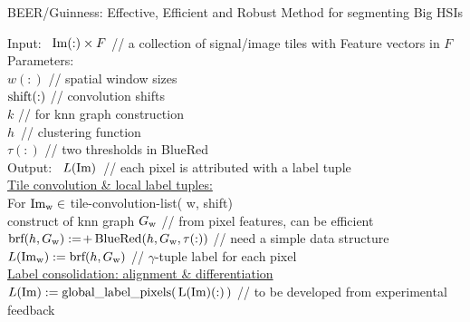 

\begin{algorithm}[H] 
  \caption{  \footnotesize
    BEER/Guinness: Effective, Efficient and Robust Method for
    segmenting Big HSIs
    \label{alg:ben-tile} }
  \SetAlgoLined
  {Input:\ } ${\rm Im}(:) \times F$ \phantom{space}
  // {\footnotesize a collection of signal/image tiles with Feature vectors in $F$}
  \\
  {\rm Parameters:\ }
  \\
  \phantom{Input:\ } $w(:)$ \phantom{make space}
  // {\footnotesize spatial window sizes}
  \\
  \phantom{Input:\ } $ {\rm shift}(:) $ \phantom{space xxx}
  // {\footnotesize convolution shifts}
  \\
  \phantom{Input:\ } $ k $ \phantom{make space xxx}
  // {\footnotesize for knn graph construction}
  \\
  \phantom{Input:\ } $h$\, \phantom{make space xx}
  // {\footnotesize clustering function}
  \\
  \phantom{Input:\ } $ \tau(:) $ \phantom{make space}
  // {\footnotesize two thresholds in BlueRed}
  \\
  {\rm Output:\ } $L(\rm Im)$\, \phantom{space}
  // {\footnotesize each pixel is attributed with a label tuple}
  \\
  \underline{Tile convolution \& local label tuples:}
  \\ 
  For $\mbox{\rm Im}_{\rm w}  \in$ {\rm tile-convolution-list}( w, shift)
  \\
  \phantom{xxx} construct of knn graph $G_{\rm w}$
  \phantom{make space }
  // {\footnotesize from pixel features, can be efficient}  
  \\
  \phantom{xxx}
  $\mbox{\rm brf}(h,G_{\rm w}) :=\!+\! {\  }
    \mbox{\rm BlueRed}( h,G_{\rm w}, \tau(:) )$
    \phantom{xxxx}
    // {\footnotesize need a simple data structure}  
  \\
  \phantom{xxx}
  $L({\rm Im}_{\rm w}) := \mbox{\rm brf}(h,G_{\rm w})$
  \phantom{make space to align}
  // {\footnotesize $\gamma$-tuple label for each pixel } 
  \\
  \underline{Label consolidation: alignment \& differentiation}
  \\
  $L(\rm Im) := \mbox{\rm global\_label\_pixels}(\, L({\rm Im})(:)\, ) $ 
  \phantom{xx} // {\footnotesize \* to be developed from experimental feedback} 
  \\
  \phantom{make invisible space}
\end{algorithm}

